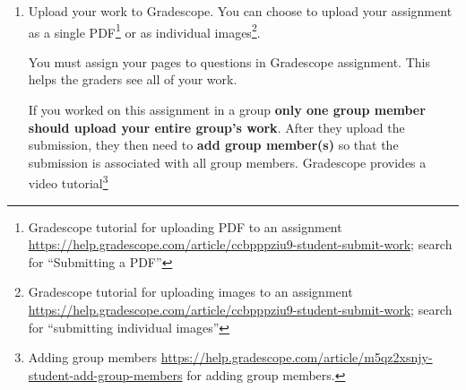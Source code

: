 \documentclass[12pt, oneside]{article}
\begin{document}
\begin{enumerate}
\item Upload your work to Gradescope.  
You can choose to upload your assignment as a single PDF\footnote{Gradescope tutorial for 
uploading PDF to an assignment \url{https://help.gradescope.com/article/ccbpppziu9-student-submit-work}; search for ``Submitting a PDF''}
or as individual images\footnote{Gradescope tutorial for uploading images to an assignment \url{https://help.gradescope.com/article/ccbpppziu9-student-submit-work}; search for ``submitting individual images''}.

You must assign your pages to questions in Gradescope assignment. This helps the graders see all of your work.

If you worked on this assignment in a group 
{\bf only one group member should upload your entire group's work}.  After they upload the submission,
they then need to {\bf add group member(s)} so that the submission is associated with 
all group members. Gradescope provides a video tutorial\footnote{Adding group members 
\url{https://help.gradescope.com/article/m5qz2xsnjy-student-add-group-members} for adding group members.}


\end{enumerate}
\end{document}
